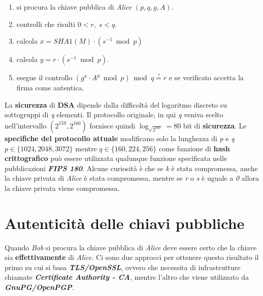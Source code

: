 \begin{itemize}
    \begin{enumerate}
        \item si procura la chiave pubblica di \textit{Alice} $(p, q, g, A)$.
        \item controlli che risulti $0 < r, \; s < q$.
        \item calcola $x = SHA1(M) \cdot (s^{-1} \bmod p)$
        \item calcola $y = r \cdot (s^{-1} \bmod p)$.
        \item esegue il controllo $(g^x \cdot A^y \bmod p) \bmod q \stackrel{?}{=} r$ e se verificato accetta la firma come autentica. 
    \end{enumerate}
\end{itemize}
La \textbf{sicurezza} di \textbf{DSA} dipende dalla difficoltà del logaritmo discreto su sottogruppi di \textit{q} elementi. Il protocollo originale, in qui \textit{q} veniva scelto nell'intervallo $(2^{159}, 2^{160})$ fornisce quindi $\log_{\sqrt{2^{160}}} = 80$ bit di \textbf{sicurezza}. Le \textbf{specifiche del protocollo attuale} modificano solo la lunghezza di \textit{p} e \textit{q} $p \in \{1024, 2048, 3072\}$ mentre $q \in \{160, 224, 256\}$ come funzione di \textbf{hash crittografico} può essere utilizzata qualunque funzione specificata nelle pubblicazioni \textbf{\textit{FIPS 180}}. Alcune curiosità è che se \textit{k} è stata compromessa, anche la chiave privata di \textit{Alice} è stata compromessa, mentre se \textit{r} o \textit{s} è uguale a \textit{0} allora la chiave privata viene compromessa.

\section{Autenticità delle chiavi pubbliche}
Quando \textit{Bob} si procura la chiave pubblica di \textit{Alice} deve essere certo che la chiave sia \textbf{effettivamente} di \textit{Alice}. Ci sono due approcci per ottenere questo risultato il primo su cui si basa \textbf{\textit{TLS/OpenSSL}}, ovvero che necessita di infrastrutture chiamate \textbf{\textit{Certificate Authority - CA}}, mentre l'altro che viene utilizzato da \textbf{\textit{GnuPG/OpenPGP}}.

